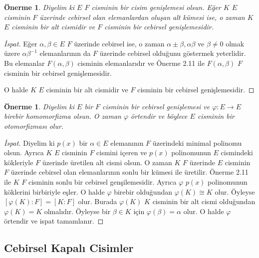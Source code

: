 \documentclass[draft]{article}
\newtheorem{prop}[thm]{Önerme}
\theoremstyle{definition}
\theoremstyle{remark}
\begin{document}
            \begin{prop}
                Diyelim ki $E$ $F$ cisminin bir cisim genişlemesi olsun. Eğer $K$ $E$ cisminin $F$ üzerinde cebirsel olan elemanlardan oluşan alt kümesi ise, o zaman $K$ $E$ cisminin bir alt cismidir ve $F$ cisminin bir cebirsel genişlemesidir.
            \end{prop}
            
            \begin{proof}[İspat]
                Eğer $\alpha, \beta \in E$ $F$ üzerinde cebirsel ise, o zaman $\alpha \pm \beta, \alpha\beta $ ve $\beta \neq 0$ olmak üzere $\alpha\beta^{-1}$ elemanlarının da $F$ üzerinde cebirsel olduğunu göstermek yeterlidir. Bu elemanlar $F(\alpha, \beta)$ cisminin elemanlarıdır ve Önerme 2.11 ile $F(\alpha, \beta)$ $F$ cisminin bir cebirsel genişlemesidir.\par
                O halde $K$ $E$ cisminin bir alt cismidir ve $F$ cisminin bir cebirsel genişlemesidir.
            \end{proof}
            
            \begin{prop}
                Diyelim ki $E$ bir $F$ cisminin bir cebirsel genişlemesi ve $\varphi: E \to E$ birebir homomorfizma olsun. O zaman $\varphi$ örtendir ve böylece $E$ cisminin bir otomorfizması olur.
            \end{prop}
            
            \begin{proof}[İspat]
                Diyelim ki $p(x)$ bir $\alpha \in E$ elemanının $F$ üzerindeki minimal polinomu olsun. Ayrıca $K$ $E$ cisminin $F$ cismini içeren ve $p(x)$ polinomunun $E$ cismindeki kökleriyle $F$ üzerinde üretilen alt cismi olsun. O zaman $K$ $F$ üzerinde $E$ cisminin $F$ üzerinde cebirsel olan elemanlarının sonlu bir kümesi ile üretilir. Önerme 2.11 ile $K$ $F$ cisminin sonlu bir cebirsel genşilemesidir. Ayrıca $\varphi$ $p(x)$ polinomunun köklerini birbiriyle eşler. O halde $\varphi$ birebir olduğundan $\varphi(K) \cong K$ olur. Öyleyse $[\varphi(K) : F] = [K : F]$ olur. Burada $\varphi(K)$ $K$ cisminin bir alt cismi olduğundan $\varphi(K) = K$ olmalıdır. Öyleyse bir $\beta \in K$ için $\varphi(\beta) = \alpha$ olur. O halde $\varphi$ örtendir ve ispat tamamlanır.
            \end{proof}
            
        \subsection{Cebirsel Kapalı Cisimler}
        
\end{document}
